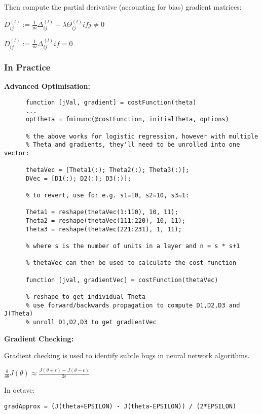 \documentclass[12pt, a4paper]{article}
\begin{document}
{      Then compute the partial derivative (accounting for bias) gradient
      matrices:

      $D_{ij}^{(l)} := \frac{1}{m} \Delta_{ij}^{(l)} + \lambda
      \Theta_{ij}^{(l)} if j \neq 0$

      $D_{ij}^{(l)} := \frac{1}{m} \Delta_{ij}^{(l)} if = 0$

      \newpage

    \subsubsection{In Practice}
    
      \textbf{Advanced Optimisation:}
      \begin{lstlisting}
      function [jVal, gradient] = costFunction(theta)
      ...
      optTheta = fminunc(@costFunction, initialTheta, options)
      
      % the above works for logistic regression, however with multiple
      % Theta and gradients, they'll need to be unrolled into one vector:

      thetaVec = [Theta1(:); Theta2(:); Theta3(:)];
      DVec = [D1(:); D2(:); D3(:)];

      % to revert, use for e.g. s1=10, s2=10, s3=1:

      Theta1 = reshape(thetaVec(1:110), 10, 11);
      Theta2 = reshape(thetaVec(111:220), 10, 11);
      Theta3 = reshape(thetaVec(221:231), 1, 11);

      % where s is the number of units in a layer and n = s * s+1

      % thetaVec can then be used to calculate the cost function

      function [jval, gradientVec] = costFunction(thetaVec)

      % reshape to get individual Theta
      % use forward/backwards propagation to compute D1,D2,D3 and J(Theta)
      % unroll D1,D2,D3 to get gradientVec
      \end{lstlisting}

      \textbf{Gradient Checking:}

      Gradient checking is used to identify subtle bugs in neural network
      algorithms.

      $\frac{\delta}{\delta\theta} J(\theta) \approx \frac{J(\theta+\epsilon)
      - J(\theta-\epsilon)}{2\epsilon}$

      In octave: 
      
      \texttt{gradApprox = (J(theta+EPSILON) - J(theta-EPSILON)) / (2*EPSILON)}

}
\end{document}
